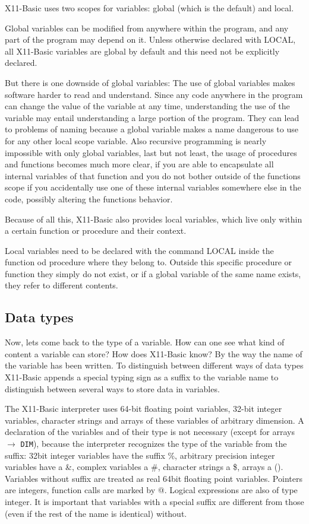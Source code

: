 X11-Basic uses two scopes for variables: global (which is the default) and 
local. 

Global variables can be modified from anywhere within the program, and
any part of the program may depend on it. Unless otherwise declared with LOCAL, 
all X11-Basic variables are global by default and this need not be explicitly 
declared.

But there is one downside of global variables: The use of global variables
makes software harder to read and understand. Since any code anywhere in the
program can change the value of the variable at any time, understanding the use
of the variable may entail understanding a large portion of the program. They
can lead to problems of naming because a global variable makes a name dangerous
to use for any other local scope variable. Also recursive programming is
nearly impossible with only global variables, last but not least, the usage of
procedures and functions becomes much more clear, if you are able to encapsulate
all internal variables of that function and you do not bother outside of the 
functions scope if you accidentally use one of these internal variables
somewhere else in the code, possibly altering the functions behavior.

Because of all this, X11-Basic also provides local variables, which live only
within a certain function or procedure and their context.

Local variables need to be declared with the command LOCAL inside the function
od procedure where they belong to. Outside this specific procedure or function 
they simply do not exist, or if a global variable of the same name exists, they 
refer to different contents.

\subsection{Data types}

Now, lets come back to the type of a variable. How can one see what kind of
content a variable can store? How does X11-Basic know? By the way the name of
the variable has been written. To distinguish between different ways of data
types X11-Basic appends a special typing sign as a suffix to the variable name
to distinguish between several ways to store data in variables. 

The X11-Basic interpreter uses 64-bit floating point variables, 32-bit integer
variables, character strings and arrays of these variables of arbitrary
dimension. A declaration of the variables and of their type is not necessary
(except for arrays $\rightarrow$ \verb|DIM|), because the interpreter recognizes
the type of the variable from the suffix: 32bit integer variables have the
suffix \%, arbitrary precision integer variables have a \&,   complex variables
a \#,  character strings a \$, arrays a (). Variables without suffix are treated
as real 64bit floating point variables. Pointers are integers,  function calls
are marked by @. Logical expressions are also of type integer. It is important
that variables with a special suffix are different from those (even if the rest
of the name is identical) without.


